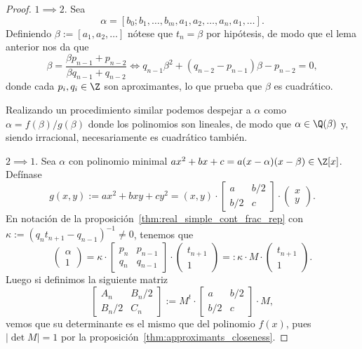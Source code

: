 \documentclass[teoria-numeros.tex]{subfiles}
\begin{document}
\begin{proof}
	$1 \implies 2$.
	Sea
	\[
		\alpha = [b_0; b_1, \dots, b_m, a_1, a_2, \dots, a_n, a_1, \dots].
	\]
	Definiendo $\beta := [a_1, a_2, \dots]$ nótese que $t_n = \beta$ por hipótesis, de modo que el lema anterior nos da que
	$$ \beta = \frac{ \beta p_{n-1} + p_{n-2} }{ \beta q_{n-1} + q_{n-2} } \iff q_{n-1} \beta^2 + (q_{n-2} - p_{n-1}) \beta - p_{n-2} = 0, $$
	donde cada $p_i, q_i \in \Z$ son aproximantes, lo que prueba que $\beta$ es cuadrático.

	Realizando un procedimiento similar podemos despejar a $\alpha$ como $\alpha = f(\beta)/g(\beta)$ donde los polinomios son lineales,
	de modo que $\alpha \in \Q(\beta)$ y, siendo irracional, necesariamente es cuadrático también.

	$2 \implies 1$.
	Sea $\alpha$ con polinomio minimal $ax^2 + bx + c = a(x - \alpha)(x - \beta) \in \Z[x]$.
	Defínase
	$$ g(x, y) := ax^2 + bxy + cy^2 = (x, y) \cdot
	\begin{bmatrix}
		a & b/2 \\
		b/2 & c
	\end{bmatrix} \cdot
	\begin{pmatrix}
		x \\ y
	\end{pmatrix}. $$
	En notación de la proposición~\ref{thm:real_simple_cont_frac_rep} con $\kappa := (q_nt_{n+1} - q_{n-1})^{-1} \ne 0$,
	tenemos que
	$$ \begin{pmatrix}
		\alpha \\ 1
	\end{pmatrix} = \kappa \cdot
	\begin{bmatrix}
		p_n & p_{n-1} \\
		q_n & q_{n-1}
	\end{bmatrix} \cdot
	\begin{pmatrix}
		t_{n+1} \\ 1
	\end{pmatrix} =:
	\kappa \cdot M \cdot
	\begin{pmatrix}
		t_{n+1} \\ 1
	\end{pmatrix}. $$
	Luego si definimos la siguiente matriz
	$$ \begin{bmatrix}
		A_n & B_n/2 \\
		B_n/2 & C_n
	\end{bmatrix} := M^t \cdot
	\begin{bmatrix}
		a & b/2 \\
		b/2 & c
	\end{bmatrix} \cdot M, $$
	vemos que su determinante es el mismo que del polinomio $f(x)$, pues $|\det M| = 1$ por la proposición~\ref{thm:approximants_closeness}.


\end{proof}
\end{document}
